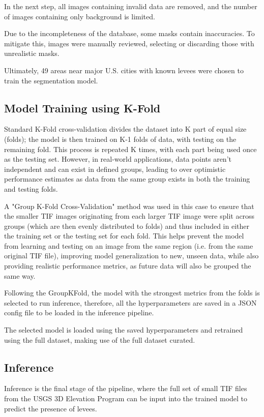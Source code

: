 \documentclass[NOTE, disdraft=true, UKenglish]{\DISCDTLATEXPATH UCLCDTDISdoc}
\begin{document}
In the next step, all images containing invalid data are removed, and the number of images containing only background is limited.

Due to the incompleteness of the database, some masks contain inaccuracies. To mitigate this, images were manually reviewed, selecting or discarding those with unrealistic masks.

Ultimately, 49 areas near major U.S. cities with known levees were chosen to train the segmentation model.


\subsection{Model Training using K-Fold}

Standard K-Fold cross-validation divides the dataset into K part of equal size (folds); the model is then trained on K-1 folds of data, with testing on the remaining fold. This process is repeated K times, with each part being used once as the testing set. However, in real-world applications, data points aren't independent and can exist in defined groups, leading to over optimistic performance estimates as data from the same group exists in both the training and testing folds.

A "Group K-Fold Cross-Validation" method was used in this case to ensure that the smaller TIF images originating from each larger TIF image were split across groups (which are then evenly distributed to folds) and thus included in either the training set or the testing set for each fold. This helps prevent the model from learning and testing on an image from the same region (i.e. from the same original TIF file), improving model generalization to new, unseen data, while also providing realistic performance metrics, as future data will also be grouped the same way.

Following the GroupKFold, the model with the strongest metrics from the folds is selected to run inference, therefore, all the hyperparameters are saved in a JSON config file to be loaded in the inference pipeline.

The selected model is loaded using the saved hyperparameters and retrained using the full dataset, making use of the full dataset curated.
\subsection{Inference}

Inference is the final stage of the pipeline, where the full set of small TIF files from the USGS 3D Elevation Program can be input into the trained model to predict the presence of levees.
\end{document}

